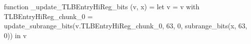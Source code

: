 function _update_TLBEntryHiReg_bits (v, x) = let v = { v with TLBEntryHiReg_chunk_0 = update_subrange_bits(v.TLBEntryHiReg_chunk_0, 63, 0, subrange_bits(x, 63, 0)) } in
  v
